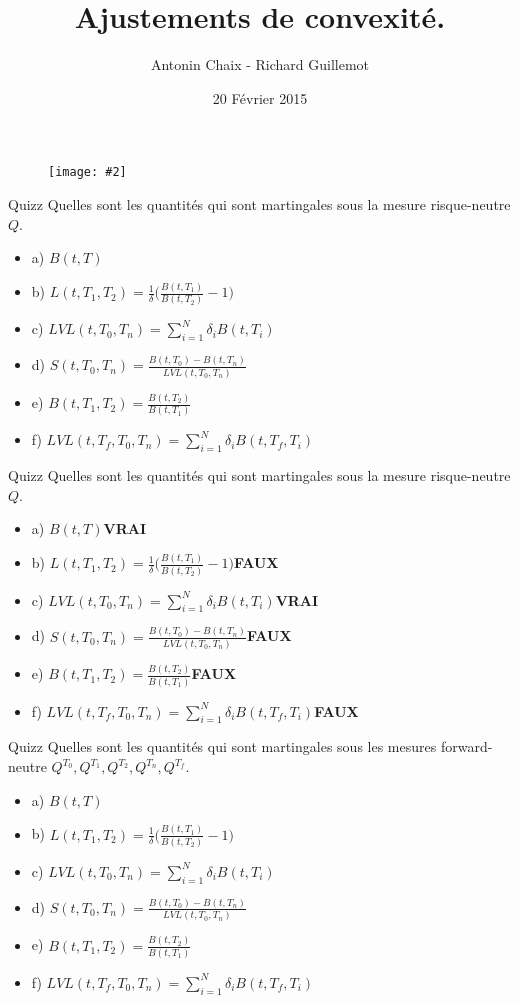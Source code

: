 \documentclass{beamer}
\title[Produits dérivés de taux]{Ajustements de convexité. }
\author{Antonin Chaix - Richard Guillemot}
\institute{Master IFMA}
\date{20 Février 2015}
\newcommand{\FIG}[2]{\texttt{[image: \#2]}}
\begin{document}
\begin{frame}
\titlepage
\begin{figure}[h]
\centering \FIG{5cm}{figures/UPMC_IFMA.jpg}
\end{figure}
\end{frame}

\begin{frame}{Quizz}
Quelles sont les quantités qui sont martingales sous la mesure risque-neutre $Q$.
\begin{itemize}
\item a) $B(t,T)$ 
\item b) $L(t,T_1,T_2)=\frac{1}{\delta}\big(\frac{B(t,T_1)}{B(t,T_2)}-1 \big)$
\item c) $\displaystyle LVL(t,T_0,T_n)=\sum_{i=1}^{N}\delta_i B(t,T_i)$
\item d) $S(t,T_0,T_n)=\frac{B(t,T_0)-B(t,T_n)}{LVL(t,T_0,T_n)}$
\item e) $B(t,T_1,T_2)=\frac{B(t,T_2)}{B(t,T_1)}$
\item f) $\displaystyle LVL(t,T_f,T_0,T_n)=\sum_{i=1}^{N}\delta_i B(t,T_f,T_i)$
\end{itemize}
\end{frame}


\begin{frame}{Quizz}
Quelles sont les quantités qui sont martingales sous la mesure risque-neutre $Q$.
\begin{itemize}
\item a) $B(t,T)$\textbf{\color{green}VRAI} 
\item b) $L(t,T_1,T_2)=\frac{1}{\delta}\big(\frac{B(t,T_1)}{B(t,T_2)}-1 \big)$\textbf{\color{red}FAUX}
\item c) $\displaystyle LVL(t,T_0,T_n)=\sum_{i=1}^{N}\delta_i B(t,T_i)$\textbf{\color{green}VRAI}
\item d) $S(t,T_0,T_n)=\frac{B(t,T_0)-B(t,T_n)}{LVL(t,T_0,T_n)}$\textbf{\color{red}FAUX}
\item e) $B(t,T_1,T_2)=\frac{B(t,T_2)}{B(t,T_1)}$\textbf{\color{red}FAUX} 
\item f) $\displaystyle LVL(t,T_f,T_0,T_n)=\sum_{i=1}^{N}\delta_i B(t,T_f,T_i)$\textbf{\color{red}FAUX}
\end{itemize}
\end{frame}

\begin{frame}{Quizz}
Quelles sont les quantités qui sont martingales sous les mesures forward-neutre $Q^{T_0}, Q^{T_1},Q^{T_2}, Q^{T_n}, Q^{T_f}$.
\begin{itemize}
\item a) $B(t,T)$
\item b) $L(t,T_1,T_2)=\frac{1}{\delta}\big(\frac{B(t,T_1)}{B(t,T_2)}-1 \big)$
\item c) $\displaystyle LVL(t,T_0,T_n)=\sum_{i=1}^{N}\delta_i B(t,T_i)$
\item d) $S(t,T_0,T_n)=\frac{B(t,T_0)-B(t,T_n)}{LVL(t,T_0,T_n)}$
\item e) $B(t,T_1,T_2)=\frac{B(t,T_2)}{B(t,T_1)}$
\item f) $\displaystyle LVL(t,T_f,T_0,T_n)=\sum_{i=1}^{N}\delta_i B(t,T_f,T_i)$
\end{itemize}
\end{frame}
\end{document}
